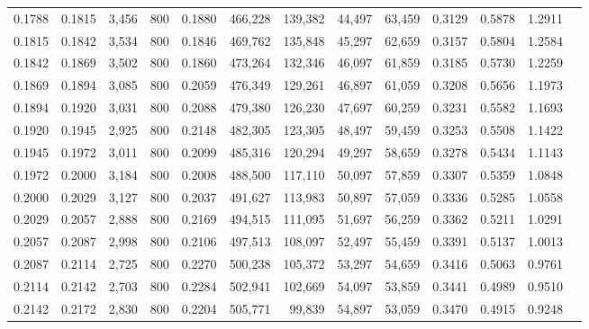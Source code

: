 \begin{tabular}{rrrrrrrrrrrrr}
0.1788 & 0.1815 &  3,456 &   800 &                                     0.1880 & 466,228 & 139,382 &  44,497 &  63,459 & 0.3129 & 0.5878 & 1.2911 \\
0.1815 & 0.1842 &  3,534 &   800 &                                     0.1846 & 469,762 & 135,848 &  45,297 &  62,659 & 0.3157 & 0.5804 & 1.2584 \\
0.1842 & 0.1869 &  3,502 &   800 &                                     0.1860 & 473,264 & 132,346 &  46,097 &  61,859 & 0.3185 & 0.5730 & 1.2259 \\
0.1869 & 0.1894 &  3,085 &   800 &                                     0.2059 & 476,349 & 129,261 &  46,897 &  61,059 & 0.3208 & 0.5656 & 1.1973 \\
0.1894 & 0.1920 &  3,031 &   800 &                                     0.2088 & 479,380 & 126,230 &  47,697 &  60,259 & 0.3231 & 0.5582 & 1.1693 \\
0.1920 & 0.1945 &  2,925 &   800 &                                     0.2148 & 482,305 & 123,305 &  48,497 &  59,459 & 0.3253 & 0.5508 & 1.1422 \\
0.1945 & 0.1972 &  3,011 &   800 &                                     0.2099 & 485,316 & 120,294 &  49,297 &  58,659 & 0.3278 & 0.5434 & 1.1143 \\
0.1972 & 0.2000 &  3,184 &   800 &                                     0.2008 & 488,500 & 117,110 &  50,097 &  57,859 & 0.3307 & 0.5359 & 1.0848 \\
0.2000 & 0.2029 &  3,127 &   800 &                                     0.2037 & 491,627 & 113,983 &  50,897 &  57,059 & 0.3336 & 0.5285 & 1.0558 \\
0.2029 & 0.2057 &  2,888 &   800 &                                     0.2169 & 494,515 & 111,095 &  51,697 &  56,259 & 0.3362 & 0.5211 & 1.0291 \\
0.2057 & 0.2087 &  2,998 &   800 &                                     0.2106 & 497,513 & 108,097 &  52,497 &  55,459 & 0.3391 & 0.5137 & 1.0013 \\
0.2087 & 0.2114 &  2,725 &   800 &                                     0.2270 & 500,238 & 105,372 &  53,297 &  54,659 & 0.3416 & 0.5063 & 0.9761 \\
0.2114 & 0.2142 &  2,703 &   800 &                                     0.2284 & 502,941 & 102,669 &  54,097 &  53,859 & 0.3441 & 0.4989 & 0.9510 \\
0.2142 & 0.2172 &  2,830 &   800 &                                     0.2204 & 505,771 &  99,839 &  54,897 &  53,059 & 0.3470 & 0.4915 & 0.9248 \\

\end{tabular}
